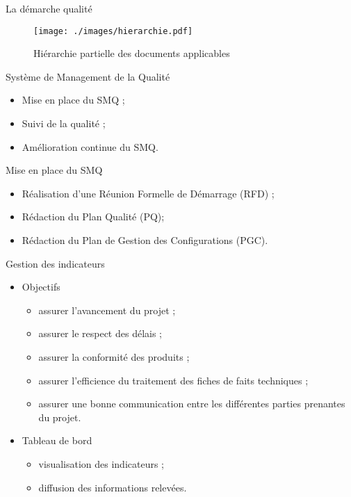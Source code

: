 \begin{frame}{La démarche qualité}
\begin{figure}
	\centering\texttt{[image: ./images/hierarchie.pdf]}
\caption{Hiérarchie partielle des documents applicables}
\end{figure}
	\end{frame}
	
	\begin{frame}{Système de Management de la Qualité}
	\begin{itemize}
		\item Mise en place du SMQ ;
		\item Suivi de la qualité ;
		\item Amélioration continue du SMQ.
	\end{itemize}
	\end{frame}
	
	\begin{frame}{Mise en place du SMQ}
	\begin{itemize}
	 \item Réalisation d'une Réunion Formelle de Démarrage (RFD) ;
	 \pause
	 \item Rédaction du Plan Qualité (PQ);
	 \item Rédaction du Plan de Gestion des Configurations (PGC).
	\end{itemize}
	\end{frame}
	
	\begin{frame}{Gestion des indicateurs}
	\begin{itemize}
		\pause
		\item Objectifs
		\begin{itemize}
		 \item assurer l'avancement du projet ;
		 \item assurer le respect des délais ;
		 \item assurer la conformité des produits ;
		 \item assurer l'efficience du traitement des fiches de faits techniques ;
		 \item assurer une bonne communication entre les différentes parties prenantes du projet.
		\end{itemize}
		\pause
		\item Tableau de bord
		\begin{itemize}
		 \item visualisation des indicateurs ;
		 \item diffusion des informations relevées.
		\end{itemize}
	\end{itemize}
	\end{frame}
	
